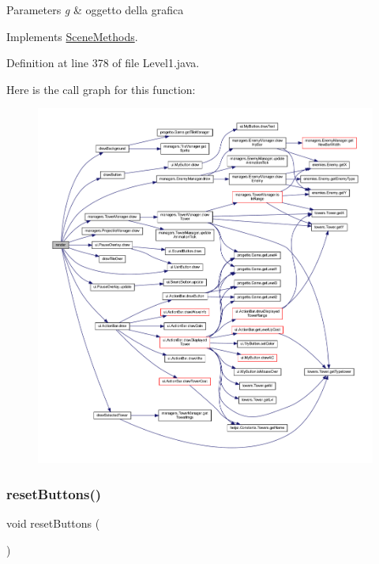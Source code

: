 \begin{DoxyParams}{Parameters}
{\em g} & oggetto della grafica \\
\hline
\end{DoxyParams}


Implements \hyperlink{interfacescenes_1_1_scene_methods_a203b6ad9d5e4d54dd1152986eec4dedc}{Scene\+Methods}.



Definition at line 378 of file Level1.\+java.

Here is the call graph for this function\+:\nopagebreak
\begin{figure}[H]
\begin{center}
\leavevmode
\includegraphics[width=350pt]{classscenes_1_1_level1_a203b6ad9d5e4d54dd1152986eec4dedc_cgraph}
\end{center}
\end{figure}
\mbox{\label{classscenes_1_1_level1_a548cf4795e9d559d0c0cce0bb57a5251}} 
\subsubsection{\texorpdfstring{reset\+Buttons()}{resetButtons()}}
{\footnotesize\ttfamily void reset\+Buttons (\begin{DoxyParamCaption}{ }\end{DoxyParamCaption})\hspace{0.3cm}{\ttfamily [private]}}



